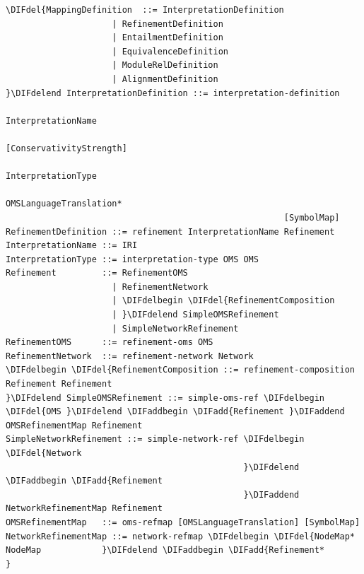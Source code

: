 \documentclass[10pt,fleqn,final]{scrreprt}
\newenvironment{definitions}[0]{\medskip }{}
\providecommand{\DIFadd}[1]{{\protect\color{blue}\uwave{#1}}} %
\providecommand{\DIFdel}[1]{{\protect\color{red}\sout{#1}}}                      %
\providecommand{\DIFaddbegin}{} %
\providecommand{\DIFaddend}{} %
\providecommand{\DIFdelbegin}{} %
\providecommand{\DIFdelend}{} %
\begin{document}
\begin{definitions}
\begin{lstlisting}[language=ebnf,escapeinside={<>},mathescape]
%DIFDELCMD < %%%
\DIFdel{MappingDefinition  ::= InterpretationDefinition
                     | RefinementDefinition
                     | EntailmentDefinition
                     | EquivalenceDefinition
                     | ModuleRelDefinition
                     | AlignmentDefinition
}\DIFdelend InterpretationDefinition ::= interpretation-definition
                                                       InterpretationName
                                                       [ConservativityStrength]
                                                       InterpretationType
                                                       OMSLanguageTranslation*
                                                       [SymbolMap]
RefinementDefinition ::= refinement InterpretationName Refinement
InterpretationName ::= IRI
InterpretationType ::= interpretation-type OMS OMS
Refinement         ::= RefinementOMS
                     | RefinementNetwork
                     | \DIFdelbegin \DIFdel{RefinementComposition
                     | }\DIFdelend SimpleOMSRefinement
                     | SimpleNetworkRefinement
RefinementOMS      ::= refinement-oms OMS
RefinementNetwork  ::= refinement-network Network
\DIFdelbegin \DIFdel{RefinementComposition ::= refinement-composition Refinement Refinement
}\DIFdelend SimpleOMSRefinement ::= simple-oms-ref \DIFdelbegin \DIFdel{OMS }\DIFdelend \DIFaddbegin \DIFadd{Refinement }\DIFaddend OMSRefinementMap Refinement
SimpleNetworkRefinement ::= simple-network-ref \DIFdelbegin \DIFdel{Network
                                               }\DIFdelend \DIFaddbegin \DIFadd{Refinement
                                               }\DIFaddend NetworkRefinementMap Refinement
OMSRefinementMap   ::= oms-refmap [OMSLanguageTranslation] [SymbolMap]
NetworkRefinementMap ::= network-refmap \DIFdelbegin \DIFdel{NodeMap*
NodeMap            }\DIFdelend \DIFaddbegin \DIFadd{Refinement*
}\end{lstlisting}


\end{definitions}
\end{document}
